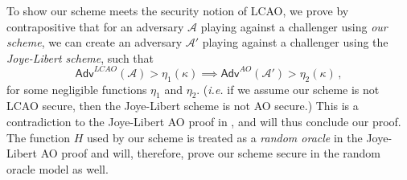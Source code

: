 \documentclass[twocolumn]{autart}
\begin{document}
To show our scheme meets the security notion of LCAO, we prove by contrapositive that for an adversary $\mathcal{A}$ playing against a challenger using \textit{our scheme}, we can create an adversary $\mathcal{A}'$ playing against a challenger using the \textit{Joye-Libert scheme}, such that
\begin{equation*}
    \mathsf{Adv}^{LCAO}(\mathcal{A}) > \eta_1(\kappa) \implies \mathsf{Adv}^{AO}(\mathcal{A}') > \eta_2(\kappa)\,,
\end{equation*}
for some negligible functions $\eta_1$ and $\eta_2$. (\textit{i.e.} if we assume our scheme is not LCAO secure, then the Joye-Libert scheme is not AO secure.) This is a contradiction to the Joye-Libert AO proof in \cite{joyeScalableSchemePrivacyPreserving2013}, and will thus conclude our proof. The function $H$ used by our scheme is treated as a \textit{random oracle} in the Joye-Libert AO proof and will, therefore, prove our scheme secure in the random oracle model as well.
\end{document}
